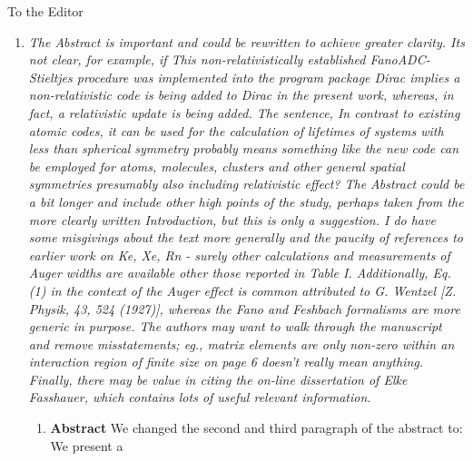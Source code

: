 \documentclass[DIN,pagenumber=false,parskip=half,fromalign=left,fromphone=true,fromemail=true,fromurl=false,fromlogo=false,fromrule=false]{scrlttr2}
\begin{document}
\begin{letter}{To the Editor}
\begin{enumerate}
{{         }}
 \item \emph{The Abstract is important and could be rewritten to achieve greater
             clarity. Its not clear, for example, if \emph{This
             non-relativistically
             established FanoADC-Stieltjes procedure was implemented into the
             program package Dirac} implies a non-relativistic code is being
             added to Dirac in the present work, whereas, in fact, a relativistic
             update is being added. The sentence, \emph{In contrast to
             existing atomic
             codes, it can be used for the calculation of lifetimes of systems
             with less than spherical symmetry} probably means something like
             \emph{the new code can be employed for atoms, molecules, clusters and
             other general spatial symmetries} presumably also including
             relativistic effect? The Abstract could be a bit longer and include
             other high points of the study, perhaps taken from the more clearly
             written Introduction, but this is only a suggestion. I do have
             some misgivings about the text more generally and the paucity of
             references to earlier work on Ke, Xe, Rn - surely other calculations
             and measurements of Auger widths are available other those reported
             in Table I. Additionally, Eq. (1) in the context of the Auger effect
             is common attributed to G. Wentzel [Z. Physik, 43, 524 (1927)],
             whereas the Fano and Feshbach formalisms are more generic in purpose.
             The authors may want to walk through the manuscript and remove
             misstatements; eg., \emph{matrix elements are only non-zero within an
             interaction region of finite size} on page 6 doesn't really mean
             anything. Finally, there may be value in citing the on-line
             dissertation of Elke Fasshauer, which contains lots of useful
             relevant information.}\\
  \begin{enumerate}
   \item \textbf{Abstract}
         We changed the second and third paragraph of the abstract to:\\
         We present a {\color{blue}{realization of the non-relativistically
         established FanoADC-Stieltjes method for the description of autoionization
         decay widths including relativistic effects.
         This procedure, being based on the
         Algebraic Diagrammatic Construction (ADC),
}}
\end{enumerate}
\end{enumerate}
\end{letter}
\end{document}
